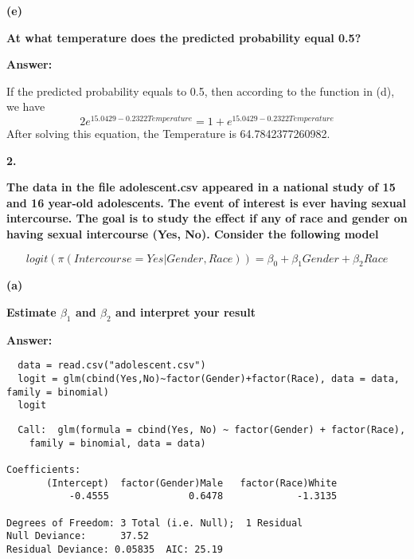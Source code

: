 \documentclass[letterpaper,11pt]{article}
\begin{document}
\begin{addmargin}[-1.1em]{0em}
  \textbf{(e)}\par
\end{addmargin}
\textbf{ At what temperature does the predicted probability equal 0.5?}\par
\bigbreak
\begin{addmargin}[-0.5em]{0em}
  \textbf{Answer: }
\end{addmargin}
If the predicted probability equals to 0.5, then according to the function in (d), we have
$$2e^{15.0429-0.2322Temperature} = 1 + e^{15.0429-0.2322Temperature}$$
After solving this equation, the Temperature is 64.7842377260982.


\begin{addmargin}[-2em]{0em}
  \large{\textbf{2. }}
\end{addmargin}
\textbf{The data in the file adolescent.csv appeared in a national study of 15 and 16 year-old adolescents. The event of interest is ever having sexual intercourse. The goal is to study the effect if any of race and gender on having sexual intercourse (Yes, No). Consider the following model}\par
$$logit(\pi(Intercourse=Yes\vert Gender, Race)) = \beta_0 + \beta_1 Gender + \beta_2 Race$$

\begin{addmargin}[-1.1em]{0em}
  \textbf{(a)}\par
\end{addmargin}
\textbf{Estimate $\beta_1$ and $\beta_2$ and interpret your result}\par
\bigbreak
\begin{addmargin}[-0.5em]{0em}
  \textbf{Answer: }
\end{addmargin}

\begin{lstlisting}
  data = read.csv("adolescent.csv")
  logit = glm(cbind(Yes,No)~factor(Gender)+factor(Race), data = data, family = binomial)
  logit
\end{lstlisting}
\begin{lstlisting}
  Call:  glm(formula = cbind(Yes, No) ~ factor(Gender) + factor(Race),
    family = binomial, data = data)

Coefficients:
       (Intercept)  factor(Gender)Male   factor(Race)White
           -0.4555              0.6478             -1.3135

Degrees of Freedom: 3 Total (i.e. Null);  1 Residual
Null Deviance:	    37.52
Residual Deviance: 0.05835 	AIC: 25.19
\end{lstlisting}
\end{document}

